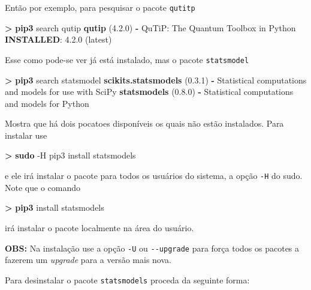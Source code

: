 \documentclass[11pt]{article}
\newenvironment{Shaded}{}{}
\newcommand{\KeywordTok}[1]{\textcolor[rgb]{0.00,0.44,0.13}{\textbf{{#1}}}}
\newcommand{\NormalTok}[1]{{#1}}
\begin{document}
Então por exemplo, para pesquisar o pacote \texttt{qutitp}

\begin{Shaded}
\begin{Highlighting}[]
\KeywordTok{>} \KeywordTok{pip3} \NormalTok{search qutip}
\KeywordTok{qutip} \NormalTok{(4.2.0)  }\KeywordTok{-} \NormalTok{QuTiP: The Quantum Toolbox in Python}
  \KeywordTok{INSTALLED}\NormalTok{: 4.2.0 (latest)}
\end{Highlighting}
\end{Shaded}

Esse como pode-se ver já está instalado, mas o pacote
\texttt{statsmodel}

\begin{Shaded}
\begin{Highlighting}[]
\KeywordTok{>} \KeywordTok{pip3} \NormalTok{search statsmodel}
\KeywordTok{scikits.statsmodels} \NormalTok{(0.3.1)  }\KeywordTok{-} \NormalTok{Statistical computations and models for use with SciPy}
\KeywordTok{statsmodels} \NormalTok{(0.8.0)          }\KeywordTok{-} \NormalTok{Statistical computations and models for Python}
\end{Highlighting}
\end{Shaded}

Mostra que há dois pocatoes disponíveis os quais não estão instalados.
Para instalar use

\begin{Shaded}
\begin{Highlighting}[]
\KeywordTok{>} \KeywordTok{sudo} \NormalTok{-H pip3 install statsmodels}
\end{Highlighting}
\end{Shaded}

e ele irá instalar o pacote para todos os usuários do sistema, a opção
\texttt{-H} do sudo. Note que o comando

\begin{Shaded}
\begin{Highlighting}[]
\KeywordTok{>} \KeywordTok{pip3} \NormalTok{install statsmodels}
\end{Highlighting}
\end{Shaded}

irá instalar o pacote localmente na área do usuário.

\textbf{OBS:} Na instalação use a opção \texttt{-U} ou
\texttt{-\/-upgrade} para força todos os pacotes a fazerem um
\emph{upgrade} para a versão mais nova.

Para desinstalar o pacote \texttt{statsmodels} proceda da seguinte
forma:
\end{document}

